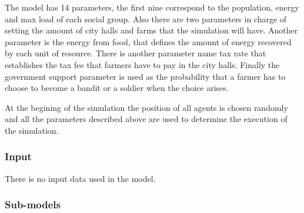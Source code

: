 \documentclass{wscpaperproc}
\begin{document}
The model has 14 parameters, the first nine correspond to the population,
energy and max load of each social group. Also there are two parameters in
charge of setting the amount of city halls and farms that the simulation will
have. Another parameter is the energy from food, that defines the amount of
energy recovered by each unit of resource. There is another parameter name tax
rate that establishes the tax fee that farmers have to pay in the city halls.
Finally the government support parameter is used as the probability that a
farmer has to choose to become a bandit or a soldier when the choice arises.

At the begining of the simulation the position of all agents is chosen randomly
and all the parameters described above are used to determine the execution of
the simulation.

\subsubsection{Input}

There is no input data used in the model.

\subsubsection{Sub-models}
\end{document}
